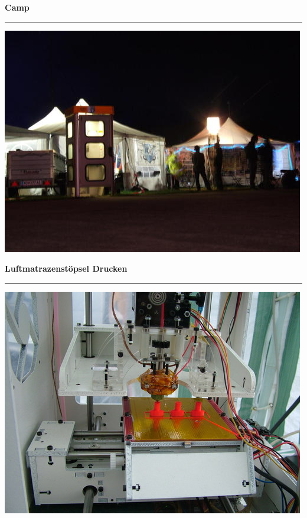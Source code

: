 \documentclass{seminar}
\providecommand{\T}[1]{
	\begin{center}
		{\bf #1}
	\end{center}
	\vspace{2mm}
	\hrule
	\vspace{2mm}
}
\begin{document}
\begin{slide}
	\T{Camp}
	\begin{center}
		\includegraphics[scale=0.5]{camp.jpeg}
	\end{center}
\end{slide}

\begin{slide}
	\T{Luftmatrazenstöpsel Drucken}
	\begin{center}
		\includegraphics[scale=0.5]{air_matrace_plugs.jpeg}
	\end{center}
\end{slide}
\end{document}
